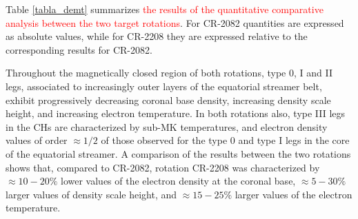 \documentclass[namedreferences]{solarphysics}
\def\edit#1{\textcolor{Red}{#1}}
\begin{document}
\begin{article}
Table \ref{tabla_demt} summarizes \edit{the results of the quantitative comparative analysis between the two {target rotations}}. For CR-2082 quantities are expressed as absolute values, {while} for CR-2208 they are expressed relative to the corresponding results for CR-2082.

{Throughout the magnetically closed region of both rotations, type 0, I and II legs, associated to  increasingly outer layers of the equatorial streamer belt, exhibit progressively decreasing coronal base density, increasing density scale height, and increasing electron temperature. In both rotations also, type III legs in the CHs are characterized by sub-MK temperatures, and electron density values of order $\approx 1/2$ of those observed for the type 0 and type I legs in the core of the equatorial streamer.} {A comparison of the results between the two rotations shows that, compared to CR-2082, rotation CR-2208 was characterized by {$\approx 10-20\%$} lower values of the electron density at the coronal base, $\approx 5-30\%$ larger values of density scale height, and {$\approx 15-25\%$} larger values of the electron temperature.} 


\end{article}
\end{document}
